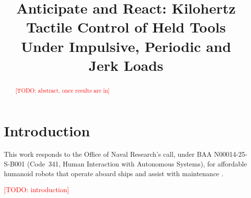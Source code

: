 \documentclass[conference]{IEEEtran}
\title{Anticipate and React: Kilohertz Tactile Control of Held Tools Under Impulsive, Periodic and Jerk Loads}
\author{\todo{authors}}
\newcommand{\todo}[1]{\textcolor{red}{[TODO: #1]}}
\begin{document}
\maketitle

\begin{abstract}
\todo{abstract, once results are in}
\end{abstract}

\section{Introduction}
This work responds to the Office of Naval Research's call, under BAA N00014-25-S-B001 (Code~341, Human Interaction with Autonomous Systems), for affordable humanoid robots that operate aboard ships and assist with maintenance \cite{onr2025baa,onr341hias}.

\todo{introduction}





\end{document}
